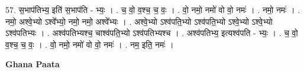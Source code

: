 \documentclass[17pt]{extarticle}
\begin{document}
57. स॒भाप॑तिभ्य॒ इति॑ स॒भाप॑ति - भ्यः॒ । . च॒ वो॒ व॒श्च॒ च॒ वः॒ । . वो॒ नमो॒ नमो॑ वो वो॒ नमः॑ । . नमो॒ नमः॑ । . नमो॒ अश्वे॒भ्यो ऽश्वे᳚भ्यो॒ नमो॒ नमो॒ अश्वे᳚भ्यः । . अश्वे॒भ्यो ऽश्व॑पति॒भ्यो ऽश्व॑पति॒भ्यो ऽश्वे॒भ्यो ऽश्वे॒भ्यो ऽश्व॑पतिभ्यः । . अश्व॑पतिभ्यश्च॒ चाश्व॑पति॒भ्यो ऽश्व॑पतिभ्यश्च । . अश्व॑पतिभ्य॒ इत्यश्व॑पति - भ्यः॒ । . च॒ वो॒ व॒श्च॒ च॒ वः॒ । . वो॒ नमो॒ नमो॑ वो वो॒ नमः॑ । . नम॒ इति॒ नमः॑ । \newline

\textbf{Ghana Paata } \newline
\end{document}

